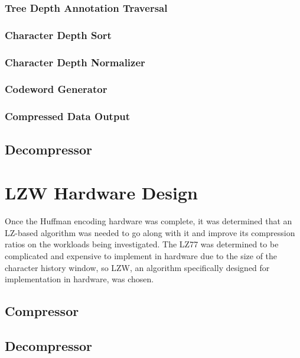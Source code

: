 \documentclass[doublespace,draft,nopageskip]{VTthesis} %
\begin{document}
\subsubsection{Tree Depth Annotation Traversal}\label{sss:tree_depth_counter}

\subsubsection{Character Depth Sort}\label{sss:sort}

\subsubsection{Character Depth Normalizer}\label{sss:tree_normalizer}

\subsubsection{Codeword Generator}\label{sss:codeword_generator}

\subsubsection{Compressed Data Output}\label{sss:compressor_output}

\subsection{Decompressor}\label{ss:huffman_hardware_decompressor}

\section{LZW Hardware Design}\label{se:lzw_hardware_design}
Once the Huffman encoding hardware was complete, it was determined that an LZ-based algorithm was needed to go along with it and improve its compression ratios on the workloads being investigated. The LZ77 was determined to be complicated and expensive to implement in hardware due to the size of the character history window, so LZW, an algorithm specifically designed for implementation in hardware, was chosen.

\subsection{Compressor}\label{ss:lzw_hardware_compressor}
\subsection{Decompressor}\label{ss:lzw_hardware_decompressor}
\end{document}
